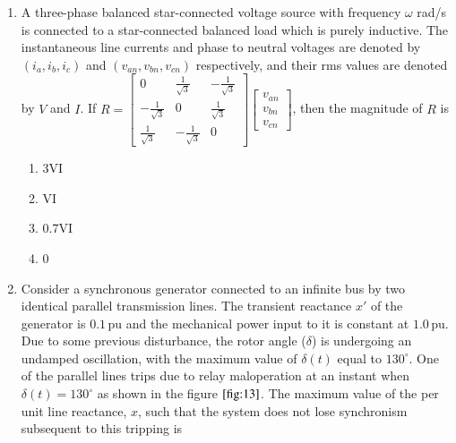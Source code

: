 \documentclass[journal]{IEEEtran}
\numberwithin{equation}{enumi}
\numberwithin{figure}{enumi}
\begin{document}
\begin{enumerate}
\begin{multicols}{4}
\begin{enumerate}
        \item 5, 6, 7, 3, 1, 2
        \item 5, 1, 2, 3, 6, 7
    \end{enumerate}
    \end{multicols}
    \bigskip
    \item A three-phase balanced star-connected voltage source with frequency $\omega$ rad/s is connected to a star-connected balanced load which is purely inductive. The instantaneous line currents and phase to neutral voltages are denoted by $(i_a, i_b, i_c)$ and $(v_{an}, v_{bn}, v_{cn})$ respectively, and their rms values are denoted by $V$ and $I$.
    If $R = \begin{bmatrix}
    0 & \frac{1}{\sqrt{3}} & -\frac{1}{\sqrt{3}} \\
    -\frac{1}{\sqrt{3}} & 0 & \frac{1}{\sqrt{3}} \\
    \frac{1}{\sqrt{3}} & -\frac{1}{\sqrt{3}} & 0
    \end{bmatrix} \begin{bmatrix}
    v_{an} \\
    v_{bn} \\
    v_{cn}
\end{bmatrix}$, then the magnitude of $R$ is
\begin{multicols}{4}
\begin{enumerate}
    \item 3VI
    \item VI
    \item 0.7VI
    \item 0
\end{enumerate}
\end{multicols}
    \bigskip
    \item 
Consider a synchronous generator connected to an infinite bus by two identical parallel transmission lines. The transient reactance $x'$ of the generator is $0.1 \, \text{pu}$ and the mechanical power input to it is constant at $1.0 \, \text{pu}$. Due to some previous disturbance, the rotor angle ($\delta$) is undergoing an undamped oscillation, with the maximum value of $\delta(t)$ equal to $130^\circ$. One of the parallel lines trips due to relay maloperation at an instant when $\delta(t) = 130^\circ$ as shown in the figure $\ref{fig:13}$. The maximum value of the per unit line reactance, $x$, such that the system does not lose synchronism subsequent to this tripping is

\vfill
\begin{figure}[!ht]
    \centering
\end{figure}
\end{enumerate}
\end{document}
